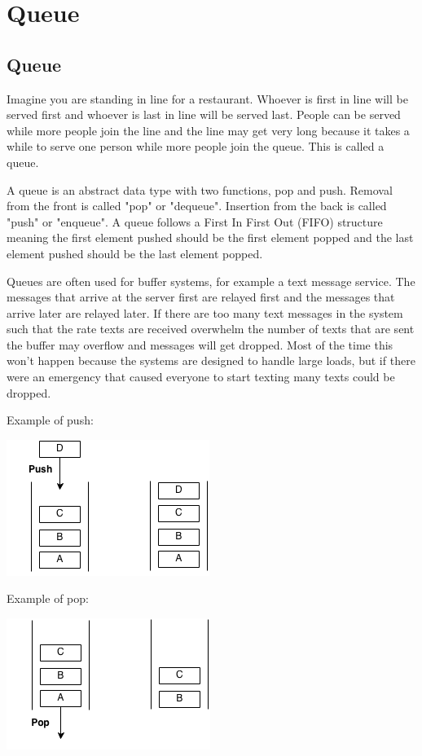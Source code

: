 \documentclass[11pt,oneside]{book}
\makeatletter
\def\maxwidth#1{\ifdim\Gin@nat@width>#1 #1\else\Gin@nat@width\fi}
\makeatother
\begin{document}
    \chapter{ Queue }
        \section{ Queue }
        

Imagine you are standing in line for a restaurant. Whoever is first in line will be served first and whoever is last in line will be served last. People can be served while more people join the line and the line may get very long because it takes a while to serve one person while more people join the queue. This is called a queue.

A queue is an abstract data type with two functions, pop and push. Removal from the front is called "pop" or "dequeue". Insertion from the back is called "push" or "enqueue". A queue follows a First In First Out (FIFO) structure meaning the first element pushed should be the first element popped and the last element pushed should be the last element popped.

Queues are often used for buffer systems, for example a text message service. The messages that arrive at the server first are relayed first and the messages that arrive later are relayed later. If there are too many text messages in the system such that the rate  texts are received overwhelm the number of texts that are sent the buffer may overflow and messages will get dropped. Most of the time this won't happen because the systems are designed to handle large loads, but if there were an emergency that caused everyone to start texting many texts could be dropped.

Example of push:

\includegraphics[width=\maxwidth{\textwidth}]{queue.png}

Example of pop:

\includegraphics[width=\maxwidth{\textwidth}]{queue2.png}
\end{document}
